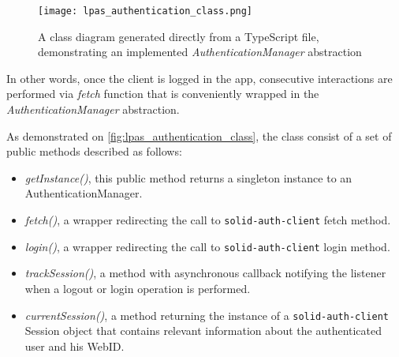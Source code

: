 \begin{figure}[h]
\centering
\texttt{[image: lpas\_authentication\_class.png]}
\caption{A class diagram generated directly from a TypeScript file, demonstrating an implemented \textit{AuthenticationManager} abstraction}
\label{fig:lpas_authentication_class}
\end{figure}


In other words, once the client is logged in the \solid{} app, consecutive interactions are performed via \textit{fetch} function that is conveniently wrapped in the \textit{AuthenticationManager} abstraction.

As demonstrated on \autoref{fig:lpas_authentication_class}, the class consist of a set of public methods described as follows:
\begin{itemize}
    \item \textit{getInstance()}, this public method returns a singleton instance to an AuthenticationManager.
    \item \textit{fetch()}, a wrapper redirecting the call to \texttt{solid-auth-client} fetch method.
    \item \textit{login()}, a wrapper redirecting the call to \texttt{solid-auth-client} login method.
    \item \textit{trackSession()}, a method with asynchronous callback notifying the listener when a logout or login operation is performed.
    \item \textit{currentSession()}, a method returning the instance of a \texttt{solid-auth-client} Session object that contains relevant information about the authenticated user and his WebID. 
\end{itemize}


